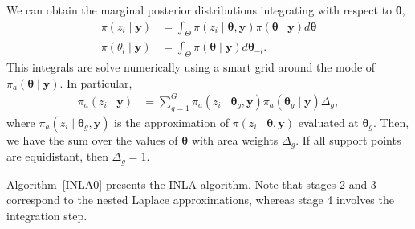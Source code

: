 We can obtain the marginal posterior distributions integrating with respect to $\boldsymbol{\theta}$,
\begin{align*}
	\pi(z_i\mid \boldsymbol{y})&=\int_{{\Theta}} \pi(z_i\mid \boldsymbol{\theta},\boldsymbol{y})\pi(\boldsymbol{\theta}\mid\boldsymbol{y})d\boldsymbol{\theta}\\
	\pi(\theta_l\mid\boldsymbol{y})&=\int_{{\Theta}} \pi(\boldsymbol{\theta}\mid \boldsymbol{y})d\boldsymbol{\theta}_{-l}.
\end{align*}
This integrals are solve numerically using a smart grid around the mode of $\pi_a(\boldsymbol{\theta}\mid\boldsymbol{y})$. In particular, 
\begin{align*}
	\pi_a(z_i\mid \boldsymbol{y})&=\sum_{g=1}^G \pi_{a}(z_i\mid \boldsymbol{\theta}_g,\boldsymbol{y})\pi_a(\boldsymbol{\theta}_g\mid \boldsymbol{y})\Delta_g,
\end{align*}
where $\pi_{a}(z_i\mid \boldsymbol{\theta}_g,\boldsymbol{y})$ is the approximation of $\pi(z_i\mid \boldsymbol{\theta},\boldsymbol{y})$ evaluated at $\boldsymbol{\theta}_g$. Then, we have the sum over the values of $\boldsymbol{\theta}$ with area weights $\Delta_g$. If all support points are equidistant, then $\Delta_g = 1$.

Algorithm~\ref{INLA0} presents the INLA algorithm. Note that stages 2 and 3 correspond to the nested Laplace approximations, whereas stage 4 involves the integration step.
    
